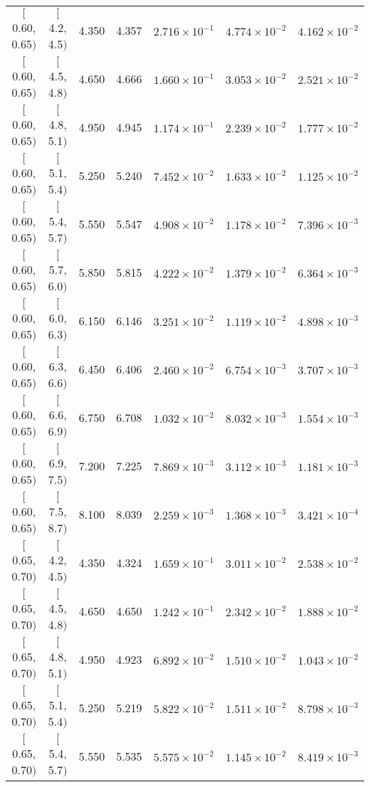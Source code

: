 \begin{longtable}{| c | c | c | c | c | c | c |}
\hline
$[$0.60, 0.65$)$ & $[$4.2, 4.5$)$ & 4.350 & 4.357 & $2.716 \times 10^{-1}$ & $4.774 \times 10^{-2}$ & $4.162 \times 10^{-2}$ \\
$[$0.60, 0.65$)$ & $[$4.5, 4.8$)$ & 4.650 & 4.666 & $1.660 \times 10^{-1}$ & $3.053 \times 10^{-2}$ & $2.521 \times 10^{-2}$ \\
$[$0.60, 0.65$)$ & $[$4.8, 5.1$)$ & 4.950 & 4.945 & $1.174 \times 10^{-1}$ & $2.239 \times 10^{-2}$ & $1.777 \times 10^{-2}$ \\
$[$0.60, 0.65$)$ & $[$5.1, 5.4$)$ & 5.250 & 5.240 & $7.452 \times 10^{-2}$ & $1.633 \times 10^{-2}$ & $1.125 \times 10^{-2}$ \\
$[$0.60, 0.65$)$ & $[$5.4, 5.7$)$ & 5.550 & 5.547 & $4.908 \times 10^{-2}$ & $1.178 \times 10^{-2}$ & $7.396 \times 10^{-3}$ \\
$[$0.60, 0.65$)$ & $[$5.7, 6.0$)$ & 5.850 & 5.815 & $4.222 \times 10^{-2}$ & $1.379 \times 10^{-2}$ & $6.364 \times 10^{-3}$ \\
$[$0.60, 0.65$)$ & $[$6.0, 6.3$)$ & 6.150 & 6.146 & $3.251 \times 10^{-2}$ & $1.119 \times 10^{-2}$ & $4.898 \times 10^{-3}$ \\
$[$0.60, 0.65$)$ & $[$6.3, 6.6$)$ & 6.450 & 6.406 & $2.460 \times 10^{-2}$ & $6.754 \times 10^{-3}$ & $3.707 \times 10^{-3}$ \\
$[$0.60, 0.65$)$ & $[$6.6, 6.9$)$ & 6.750 & 6.708 & $1.032 \times 10^{-2}$ & $8.032 \times 10^{-3}$ & $1.554 \times 10^{-3}$ \\
$[$0.60, 0.65$)$ & $[$6.9, 7.5$)$ & 7.200 & 7.225 & $7.869 \times 10^{-3}$ & $3.112 \times 10^{-3}$ & $1.181 \times 10^{-3}$ \\
$[$0.60, 0.65$)$ & $[$7.5, 8.7$)$ & 8.100 & 8.039 & $2.259 \times 10^{-3}$ & $1.368 \times 10^{-3}$ & $3.421 \times 10^{-4}$ \\
\hline
$[$0.65, 0.70$)$ & $[$4.2, 4.5$)$ & 4.350 & 4.324 & $1.659 \times 10^{-1}$ & $3.011 \times 10^{-2}$ & $2.538 \times 10^{-2}$ \\
$[$0.65, 0.70$)$ & $[$4.5, 4.8$)$ & 4.650 & 4.650 & $1.242 \times 10^{-1}$ & $2.342 \times 10^{-2}$ & $1.888 \times 10^{-2}$ \\
$[$0.65, 0.70$)$ & $[$4.8, 5.1$)$ & 4.950 & 4.923 & $6.892 \times 10^{-2}$ & $1.510 \times 10^{-2}$ & $1.043 \times 10^{-2}$ \\
$[$0.65, 0.70$)$ & $[$5.1, 5.4$)$ & 5.250 & 5.219 & $5.822 \times 10^{-2}$ & $1.511 \times 10^{-2}$ & $8.798 \times 10^{-3}$ \\
$[$0.65, 0.70$)$ & $[$5.4, 5.7$)$ & 5.550 & 5.535 & $5.575 \times 10^{-2}$ & $1.145 \times 10^{-2}$ & $8.419 \times 10^{-3}$ \\

\end{longtable}
